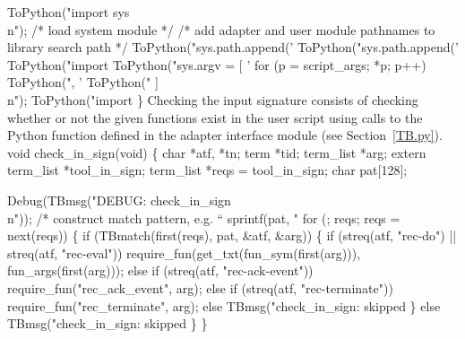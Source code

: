   ToPython("import sys\\n");                     /* load system module */
            /* add adapter and user module pathnames to library search path */
  ToPython("sys.path.append('%
  ToPython("sys.path.append('%
  ToPython("import %
  ToPython("sys.argv = [ '%
  for (p = script_args; *p; p++) 
    ToPython(", '%
  ToPython(" ]\\n");
  ToPython("import %
\}
\nwendcode{}\nwdocspar
Checking the input signature consists of checking whether or not the
given functions exist in the user script using calls to the Python
function  defined in the adapter
interface module (see Section~\ref{TB.py}).
\nwenddocs{}\plusendmoddef\nwstartdeflinemarkup{}\nwenddeflinemarkup
void check_in_sign(void) \{ 
  char *atf, *tn;
  term *tid;
  term_list *arg;
  extern term_list *tool_in_sign;
  term_list *reqs = tool_in_sign;
  char pat[128];

  Debug(TBmsg("DEBUG: check_in_sign\\n"));
                /* construct match pattern, e.g. ``%
  sprintf(pat, "%
  for (; reqs; reqs = next(reqs)) \{
    if (TBmatch(first(reqs), pat, &atf, &arg)) \{
      if (streq(atf, "rec-do") || streq(atf, "rec-eval"))
        require_fun(get_txt(fun_sym(first(arg))), fun_args(first(arg)));
      else if (streq(atf, "rec-ack-event"))
        require_fun("rec_ack_event", arg);
      else if (streq(atf, "rec-terminate"))
        require_fun("rec_terminate", arg);
      else
        TBmsg("check_in_sign: skipped %
    \} else
      TBmsg("check_in_sign: skipped %
  \}
\}

